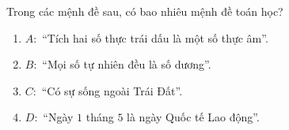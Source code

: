 \begin{ex}
Trong các mệnh đề sau, có bao nhiêu mệnh đề toán học?
\begin{enumerate}[label=\alph*)]
\item $A\colon$ ``Tích hai số thực trái dấu là một số thực âm''.
\item $B\colon$ ``Mọi số tự nhiên đều là số dương''.
\item $C\colon$ ``Có sự sống ngoài Trái Đất''.
\item $D\colon$ ``Ngày $1$ tháng $5$ là ngày Quốc tế Lao động''.
\end{enumerate}
\end{ex}
